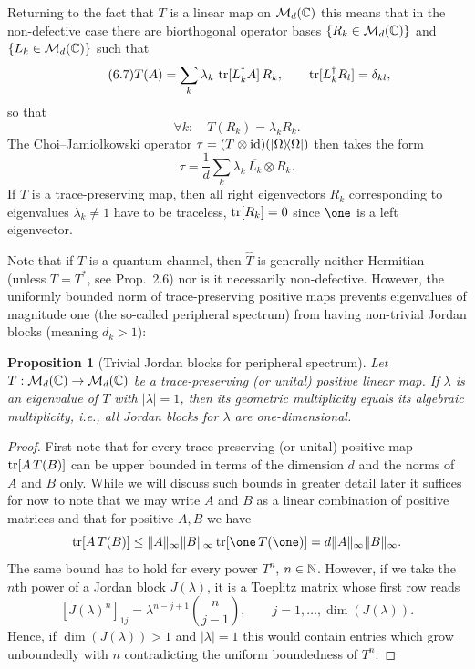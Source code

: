 \documentclass[11pt,a4paper]{article}
\theoremstyle{plain}
\newtheorem{proposition}{Proposition}[section]
\theoremstyle{definition}
\theoremstyle{remark}
\begin{document}
Returning to the fact that $T$ is a linear map on $\mathcal{M}_d(\mathbb{C})$ this means that
in the non-defective case there are biorthogonal operator bases
$\{R_k\in\mathcal{M}_d(\mathbb{C})\}$ and $\{L_k\in\mathcal{M}_d(\mathbb{C})\}$ such that
\begin{equation}\tag{6.7}\label{eq:6.7}
    T(A)=\sum_k \lambda_k\,\operatorname{tr}[L_k^\dagger A]\,R_k,
    \qquad
    \operatorname{tr}[L_k^\dagger R_l]=\delta_{kl},
\end{equation}
so that
\begin{equation}\tag{6.8}\label{eq:6.8}
    \forall k:\quad T(R_k)=\lambda_k R_k.
\end{equation}
The Choi--Jamiolkowski operator $\tau=(T\otimes \mathrm{id})(|\Omega\rangle\!\langle\Omega|)$
then takes the form
\begin{equation}\tag{6.9}\label{eq:6.9}
    \tau=\frac{1}{d}\sum_k \lambda_k\,\overline{L_k}\otimes R_k.
\end{equation}
If $T$ is a trace-preserving map, then all right eigenvectors $R_k$ corresponding
to eigenvalues $\lambda_k\neq 1$ have to be traceless, $\operatorname{tr}[R_k]=0$ since $\one$
is a left eigenvector.

Note that if $T$ is a quantum channel, then $\widehat{T}$ is generally neither
Hermitian (unless $T=T^*$, see Prop.~2.6) nor is it necessarily non-defective.
However, the uniformly bounded norm of trace-preserving positive maps prevents
eigenvalues of magnitude one (the so-called peripheral spectrum) from having
non-trivial Jordan blocks (meaning $d_k>1$):

\begin{proposition}[Trivial Jordan blocks for peripheral spectrum]
    Let $T:\mathcal{M}_d(\mathbb{C})\to\mathcal{M}_d(\mathbb{C})$ be a trace-preserving (or unital) positive linear
    map. If $\lambda$ is an eigenvalue of $T$ with $|\lambda|=1$, then its geometric
    multiplicity equals its algebraic multiplicity, i.e., all Jordan blocks for
    $\lambda$ are one-dimensional.
\end{proposition}

\begin{proof}
    First note that for every trace-preserving (or unital) positive map $\operatorname{tr}[A\,T(B)]$
    can be upper bounded in terms of the dimension $d$ and the norms of $A$ and $B$
    only. While we will discuss such bounds in greater detail later it suffices for
    now to note that we may write $A$ and $B$ as a linear combination of positive
    matrices and that for positive $A,B$ we have
    \[
        \tr[A\,T(B)] \le \|A\|_\infty\|B\|_\infty\tr[\one\,T(\one)]
        = d\|A\|_\infty\|B\|_\infty.
    \]
    The same bound has to hold for every power $T^n$, $n\in\mathbb{N}$. However, if we take
    the $n$th power of a Jordan block $J(\lambda)$, it is a Toeplitz matrix whose
    first row reads
    \begin{equation}\tag{6.10}\label{eq:6.10}
        [J(\lambda)^n]_{1j}
        = \lambda^{n-j+1}\binom{n}{j-1},
        \qquad
        j=1,\dots,\dim(J(\lambda)).
    \end{equation}
    Hence, if $\dim(J(\lambda))>1$ and $|\lambda|=1$ this would contain entries which
    grow unboundedly with $n$ contradicting the uniform boundedness of $T^n$.
\end{proof}
\end{document}
